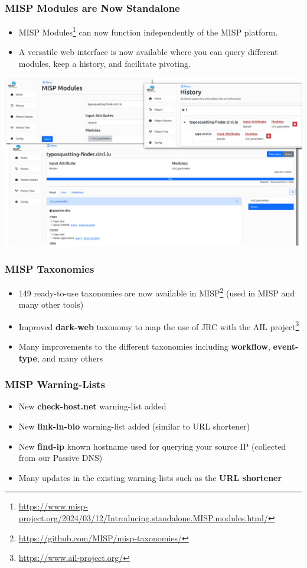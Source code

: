 \begin{frame}
\frametitle{MISP Modules are Now Standalone}
    \begin{itemize}
        \item MISP Modules\footnote{\url{https://www.misp-project.org/2024/03/12/Introducing.standalone.MISP.modules.html/}} can now function independently of the MISP platform.
        \item A versatile web interface is now available where you can query different modules, keep a history, and facilitate pivoting.
    \end{itemize}
    \begin{center}
        \includegraphics[scale=0.5]{all-modules.png}
    \end{center}
\end{frame}

\begin{frame}
    \frametitle{MISP Taxonomies}
    \begin{itemize}
        \item 149 ready-to-use taxonomies are now available in MISP\footnote{\url{https://github.com/MISP/misp-taxonomies/}} (used in MISP and many other tools)
        \item Improved \textbf{dark-web} taxonomy to map the use of JRC with the AIL project\footnote{\url{https://www.ail-project.org/}}
        \item Many improvements to the different taxonomies including \textbf{workflow}, \textbf{event-type}, and many others
    \end{itemize}
\end{frame}

\begin{frame}
    \frametitle{MISP Warning-Lists}
    \begin{itemize}
        \item New \textbf{check-host.net} warning-list added
        \item New \textbf{link-in-bio} warning-list added (similar to URL shortener)
        \item New \textbf{find-ip} known hostname used for querying your source IP (collected from our Passive DNS)
        \item Many updates in the existing warning-lists such as the \textbf{URL shortener}
    \end{itemize}
\end{frame}

